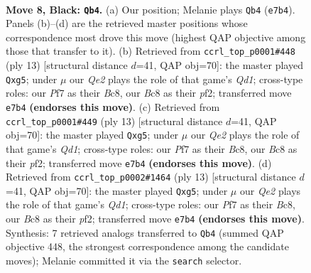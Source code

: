 \documentclass[11pt]{article}
\begin{document}
\begin{figure}[p]\centering
\begin{subfigure}{0.46\textwidth}\centering
\resizebox{\linewidth}{!}{%
\newchessgame
\chessboard[
  setfen={rnb1k2r/1ppnqppp/p3p3/3pP3/3P1P1P/2N5/PPP3P1/R2QKBNR b KQkq - 0 8},
  showmover=false,
  pgfstyle=straightmove, color=movearrow, markmove={e7-b4}
]}
\caption{}
\end{subfigure}\hfill
\begin{subfigure}{0.46\textwidth}\centering
\resizebox{\linewidth}{!}{%
\newchessgame
\chessboard[
  setfen={rnbqk2r/pppn1ppp/4p3/3pP1P1/3P4/2N5/PPP2PP1/R2QKBNR b KQkq - 0 7},
  showmover=false,
  pgfstyle=straightmove, color=movearrow, markmove={d8-g5}
]}
\caption{}
\end{subfigure}
\\[4pt]
\begin{subfigure}{0.46\textwidth}\centering
\resizebox{\linewidth}{!}{%
\newchessgame
\chessboard[
  setfen={rnbqk2r/pppn1ppp/4p3/3pP1P1/3P4/2N5/PPP2PP1/R2QKBNR b KQkq - 0 7},
  showmover=false,
  pgfstyle=straightmove, color=movearrow, markmove={d8-g5}
]}
\caption{}
\end{subfigure}\hfill
\begin{subfigure}{0.46\textwidth}\centering
\resizebox{\linewidth}{!}{%
\newchessgame
\chessboard[
  setfen={rnbqk2r/pppn1ppp/4p3/3pP1P1/3P4/2N5/PPP2PP1/R2QKBNR b KQkq - 0 7},
  showmover=false,
  pgfstyle=straightmove, color=movearrow, markmove={d8-g5}
]}
\caption{}
\end{subfigure}
\caption{\textbf{Move 8, Black: \texttt{Qb4}.} (a) Our position; Melanie plays \texttt{Qb4} (\texttt{e7b4}). Panels (b)--(d) are the retrieved master positions whose correspondence most drove this move (highest QAP objective among those that transfer to it). (b) Retrieved from \texttt{ccrl\_top\_p0001\#448} (ply 13) [structural distance $d$=41, QAP obj=70]: the master played \texttt{Qxg5}; under $\mu$ our \emph{Qe2} plays the role of that game's \emph{Qd1}; cross-type roles: our \emph{P}f7 as their \emph{B}c8, our \emph{B}c8 as their \emph{p}f2; transferred move \texttt{e7b4} \textbf{(endorses this move)}. (c) Retrieved from \texttt{ccrl\_top\_p0001\#449} (ply 13) [structural distance $d$=41, QAP obj=70]: the master played \texttt{Qxg5}; under $\mu$ our \emph{Qe2} plays the role of that game's \emph{Qd1}; cross-type roles: our \emph{P}f7 as their \emph{B}c8, our \emph{B}c8 as their \emph{p}f2; transferred move \texttt{e7b4} \textbf{(endorses this move)}. (d) Retrieved from \texttt{ccrl\_top\_p0002\#1464} (ply 13) [structural distance $d$=41, QAP obj=70]: the master played \texttt{Qxg5}; under $\mu$ our \emph{Qe2} plays the role of that game's \emph{Qd1}; cross-type roles: our \emph{P}f7 as their \emph{B}c8, our \emph{B}c8 as their \emph{p}f2; transferred move \texttt{e7b4} \textbf{(endorses this move)}. Synthesis: 7 retrieved analogs transferred to \texttt{Qb4} (summed QAP objective 448, the strongest correspondence among the candidate moves); Melanie committed it via the \texttt{search} selector.}
\label{fig:thought-m15}
\end{figure}
\end{document}
